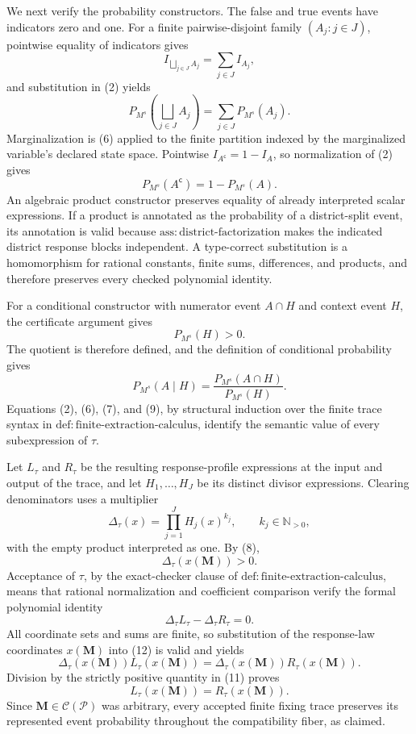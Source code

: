 We next verify the probability constructors. The false and true events have indicators zero and one. For a finite pairwise-disjoint family \((A_j:j\in J)\), pointwise equality of indicators gives
\[
 I_{\bigsqcup_{j\in J}A_j}=\sum_{j\in J}I_{A_j},
\]
and substitution in (2) yields
\[
 P_{M^s}\!\left(\bigsqcup_{j\in J}A_j\right)
 =\sum_{j\in J}P_{M^s}(A_j).
\tag{6}
\]
Marginalization is (6) applied to the finite partition indexed by the marginalized variable's declared state space. Pointwise \(I_{A^{\mathsf c}}=1-I_A\), so normalization of (2) gives
\[
 P_{M^s}(A^{\mathsf c})=1-P_{M^s}(A).
\tag{7}
\]
An algebraic product constructor preserves equality of already interpreted scalar expressions. If a product is annotated as the probability of a district-split event, its annotation is valid because \(\mathrm{ass:district\text{-}factorization}\) makes the indicated district response blocks independent. A type-correct substitution is a homomorphism for rational constants, finite sums, differences, and products, and therefore preserves every checked polynomial identity.

For a conditional constructor with numerator event \(A\cap H\) and context event \(H\), the certificate argument gives
\[
 P_{M^s}(H)>0.
\tag{8}
\]
The quotient is therefore defined, and the definition of conditional probability gives
\[
 P_{M^s}(A\mid H)
 =\frac{P_{M^s}(A\cap H)}{P_{M^s}(H)}.
\tag{9}
\]
Equations (2), (6), (7), and (9), by structural induction over the finite trace syntax in \(\mathrm{def:finite\text{-}extraction\text{-}calculus}\), identify the semantic value of every subexpression of \(\tau\).

Let \(L_\tau\) and \(R_\tau\) be the resulting response-profile expressions at the input and output of the trace, and let \(H_1,\ldots,H_J\) be its distinct divisor expressions. Clearing denominators uses a multiplier
\[
 \Delta_\tau(x)=\prod_{j=1}^{J}H_j(x)^{k_j},
 \qquad k_j\in\mathbb N_{>0},
\tag{10}
\]
with the empty product interpreted as one. By (8),
\[
 \Delta_\tau(x(\mathbf M))>0.
\tag{11}
\]
Acceptance of \(\tau\), by the exact-checker clause of \(\mathrm{def:finite\text{-}extraction\text{-}calculus}\), means that rational normalization and coefficient comparison verify the formal polynomial identity
\[
 \Delta_\tau L_\tau-\Delta_\tau R_\tau=0.
\tag{12}
\]
All coordinate sets and sums are finite, so substitution of the response-law coordinates \(x(\mathbf M)\) into (12) is valid and yields
\[
 \Delta_\tau(x(\mathbf M))L_\tau(x(\mathbf M))
 =\Delta_\tau(x(\mathbf M))R_\tau(x(\mathbf M)).
\]
Division by the strictly positive quantity in (11) proves
\[
 L_\tau(x(\mathbf M))=R_\tau(x(\mathbf M)).
\]
Since \(\mathbf M\in\mathcal C(\mathcal P)\) was arbitrary, every accepted finite fixing trace preserves its represented event probability throughout the compatibility fiber, as claimed.